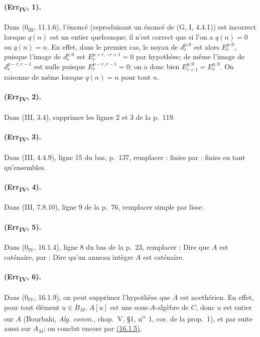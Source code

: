 \paragraph{(Err\textsubscript{IV}, 1).}
Dans ($0_{\mathrm{III}}$, 11.1.6), l'énoncé (reproduisant un énoncé de
(G, I, 4.4.1)) est incorrect lorsque $q(n)$ est un entier quelconque;
il n'est correct que si l'on a $q(n)=0$ ou $q(n)=n$. En effet, dans le
premier cas, le noyau de $d_r^{p,0}$ est alors $E_r^{p,0}$, puisque
l'image de $d_r^{p,0}$ est $E_r^{p+r,-r+1}=0$ par hypothèse; de même
l'image de $d_r^{p-r,r-1}$ est nulle puisque
$E_r^{p-r,r-1}=0$; on a donc bien $E_{r+1}^{p,0}=E_r^{p,0}$. On
raisonne de même lorsque $q(n)=n$ pour tout $n$.

\paragraph{(Err\textsubscript{IV}, 2).}
Dans (III, 3.4), supprimer les lignes 2 et 3 de la p.~119.

\paragraph{(Err\textsubscript{IV}, 3).}
Dans (III, 4.4.9), ligne 15 du bas, p.~137, remplacer : finies par :
finies en tant qu'ensembles.

\paragraph{(Err\textsubscript{IV}, 4).}
Dans (III, 7.8.10), ligne 9 de la p.~76, remplacer simple par lisse.

\paragraph{(Err\textsubscript{IV}, 5).}
Dans ($0_{\mathrm{IV}}$, 16.1.4), ligne 8 du bas de la p.~23, remplacer :
Dire que $A$ est caténaire, par : Dire qu'un anneau intègre $A$ est
caténaire.

\paragraph{(Err\textsubscript{IV}, 6).}
Dans ($0_{\mathrm{IV}}$, 16.1.9), on peut supprimer l'hypothèse que
$A$ est noethérien. En effet, pour tout élément $u\in B_M$, $A[u]$
est une sous-$A$-algèbre de $C$, donc $u$ est entier sur $A$ (Bourbaki,
\emph{Alg. comm.}, chap.~V, \S1, n\textsuperscript{o}~1, cor. de la
prop.~1), et par suite aussi sur $A_M$; on conclut encore par
{\hyperlink{ega4.c04.prop.16-1-5}{(16.1.5)}}.

